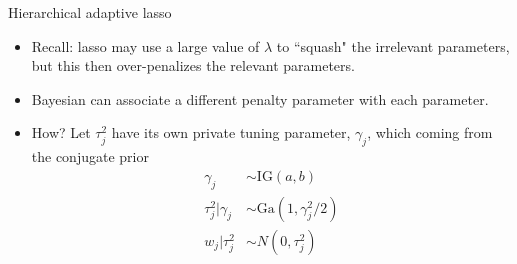 \documentclass[10pt,mathserif]{beamer}
\begin{document}
\begin{frame}{Hierarchical adaptive lasso}
\begin{itemize}
    \item Recall: lasso may use a large value of $\lambda$ to ``squash" the irrelevant parameters, but this then over-penalizes the relevant parameters.
    \item Bayesian can associate a different penalty parameter with each parameter.
    \item How? Let $\tau_j^2$ have its own private tuning parameter, $\gamma_j$, which coming from the conjugate prior
    \begin{equation*}
      \begin{split}
          \gamma_j & \sim \text{IG}(a, b)\\
          \tau_j^2|\gamma_j & \sim \text{Ga}(1,\gamma_j^2/2)\\
          w_j|\tau_j^2 & \sim N(0,\tau_j^2)
      \end{split}
    \end{equation*}
\end{itemize}
\end{frame}
\end{document}
